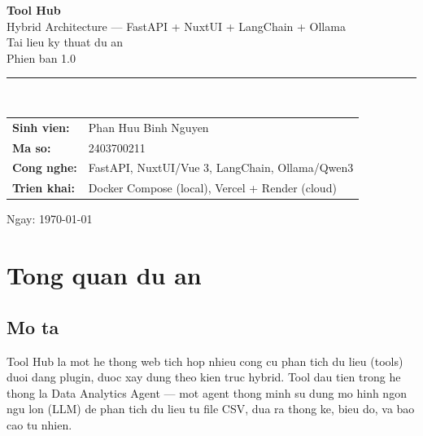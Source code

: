 \documentclass[12pt,a4paper]{article}
\begin{document}
\begin{titlepage}
\centering
\vspace*{6em}
{\Huge\bfseries\color{primary} Tool Hub}\\[1em]
{\Large Hybrid Architecture --- FastAPI + NuxtUI + LangChain + Ollama}\\[2em]
{\large\color{graytext} Tai lieu ky thuat du an}\\[1em]
{\large\color{graytext} Phien ban 1.0}\\[3em]

\rule{0.6\textwidth}{0.5pt}\\[2em]

\begin{tabular}{ll}
\bfseries Sinh vien: & Phan Huu Binh Nguyen \\
\bfseries Ma so:     & 2403700211 \\
\bfseries Cong nghe: & FastAPI, NuxtUI/Vue 3, LangChain, Ollama/Qwen3 \\
\bfseries Trien khai: & Docker Compose (local), Vercel + Render (cloud) \\
\end{tabular}

\vfill
{\small\color{graytext} Ngay: \today}
\end{titlepage}

\tableofcontents
\newpage

\section{Tong quan du an}

\subsection{Mo ta}

Tool Hub la mot he thong web tich hop nhieu cong cu phan tich du lieu (tools)
duoi dang plugin, duoc xay dung theo kien truc hybrid. Tool dau tien trong he
thong la Data Analytics Agent --- mot agent thong minh su dung mo hinh ngon ngu
lon (LLM) de phan tich du lieu tu file CSV, dua ra thong ke, bieu do, va bao
cao tu nhien.
\end{document}
